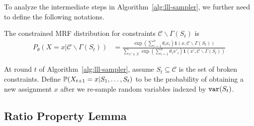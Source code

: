 To analyze the intermediate steps in Algorithm~\ref{alg:lll-sampler}, we
further need to define the following notations.
\begin{definition}  \label{def:general-cmrf}
    The constrained MRF distribution for constraints $\mathcal{C}\backslash \Gamma(S_t)$ is
    \begin{equation*}
        \begin{aligned}
            P_{\theta}(X=x|\mathcal{C}\backslash \Gamma(S_t)) & =\frac{\exp(\sum_{i=1}^n\theta_i x_i)\mathbf{1}(x,\mathcal{C}\backslash \Gamma(S_t))}{\sum_{x'\in\mathcal{X}}\exp(\sum_{i=1}^n\theta_i x'_i)\mathbf{1}(x',\mathcal{C}\backslash \Gamma(S_t))}
        \end{aligned}
    \end{equation*}
\end{definition}

\begin{definition}  \label{def:prs-prob}
    At round $t$ of Algorithm~\ref{alg:lll-sampler}, assume $S_t\subseteq\mathcal{C}$ is the set of broken constraints. Define $\mathbb{P}(X_{t+1}=x|S_1,\ldots, S_t)$ to be the probability of obtaining a new assignment $x$ after we re-sample random variables indexed by $\mathtt{var}(S_t)$.
\end{definition}
\subsection{Ratio Property Lemma}

